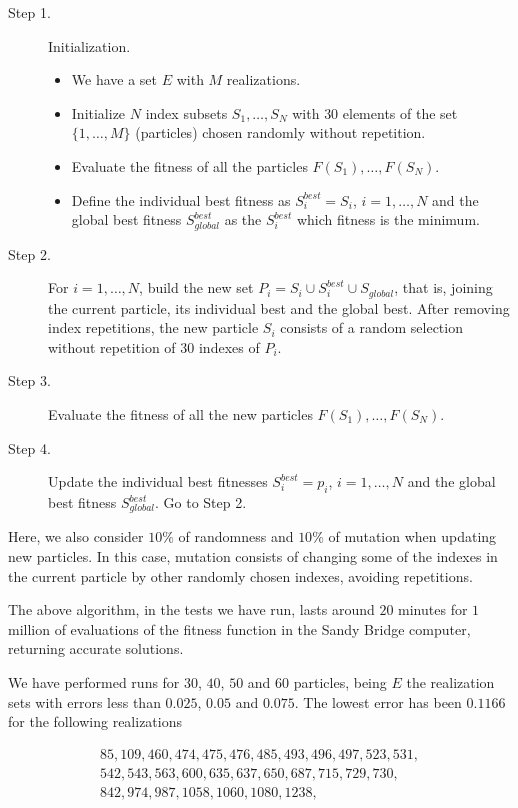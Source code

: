 \begin{description}
	\item[Step 1.] Initialization.
	\begin{itemize}
		\item We have a set $E$ with $M$ realizations.
		\item Initialize $N$ index subsets $S_1,\ldots,S_N$ with $30$ elements of the set $\{1,\ldots,M\}$ (particles) chosen randomly without repetition.
		\item Evaluate the fitness of all the particles $F(S_1), \ldots, F(S_N)$.
		\item Define the individual best fitness as $S_i^{best} = S_i$, $i=1,\ldots,N$ and the global best fitness $S_{global}^{best}$ as the $S_i^{best}$ which fitness is the minimum.
	\end{itemize}
	\item[Step 2.] For $i=1,\ldots,N$, build the new set $P_i=S_i \cup S_i^{best} \cup S_{global}$, that is, joining the current particle, its individual best and the global best. After removing index repetitions, the new particle $S_i$ consists of a random selection without repetition of $30$ indexes of $P_i$.
	\item[Step 3.] Evaluate the fitness of all the new particles $F(S_1), \ldots, F(S_N)$.	
	\item[Step 4.] Update the individual best fitnesses $S_i^{best} = p_i$, $i=1,\ldots,N$ and  the global best fitness $S_{global}^{best}$. Go to Step 2. 
\end{description}

Here, we also consider $10\%$ of randomness and $10\%$ of mutation when updating new particles. In this case, mutation consists of changing some of the indexes in the current particle by other randomly chosen indexes, avoiding repetitions.

The above algorithm, in the tests we have run, lasts around $20$ minutes for $1$ million of evaluations of the fitness function in the Sandy Bridge computer, returning accurate solutions.

We have performed runs for $30$, $40$, $50$ and $60$ particles, being $E$ the realization sets with errors less than $0.025$, $0.05$ and $0.075$. The lowest error has been $0.1166$ for the following realizations  

\begin{equation}
\begin{array}{c}
85, 109, 460, 474, 475, 476, 485, 493, 496, 497, 523, 531, \\
542, 543, 563, 600, 635, 637, 650, 687, 715, 729, 730, \\
842, 974, 987, 1058, 1060, 1080, 1238,	
\end{array}
\label{laselegidas}    
\end{equation}


